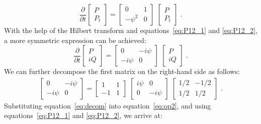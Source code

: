 \begin{equation}
\frac{\partial}{\partial t}\left[ 
\begin{array}{c}
  P \\ 
  P_t \end{array} \right] 
= \left[ 
\begin{array}{cc}
  0 & 1  \\
  -\psi^2 & 0 \end{array} \right] 
\; \left[ 
\begin{array}{c}
  P \\ 
  P_t \end{array} \right] \; .  \label{eqn:op1}
\end{equation}
With the help of the Hilbert transform and equations~\ref{eq:P12_1} and \ref{eq:P12_2}, a more symmetric expression can be achieved:
\begin{equation}
\frac{\partial}{\partial t}\left[ 
\begin{array}{c}
  P \\ 
  iQ \end{array} \right] 
= \left[ 
\begin{array}{cc}
  0      & -i\psi  \\
  -i\psi  & 0 \end{array} \right] 
\; \left[ 
\begin{array}{c}
  P \\ 
  iQ \end{array} \right] \; .  \label{eq:op2}
\end{equation}
We can further decompose the first matrix on the right-hand side as follows:
\begin{eqnarray}
 \label{eq:decom}
\left[ 
\begin{array}{cc}
  0      & -i\psi  \\
  -i\psi  & 0 \end{array} \right] = 
\left[ 
\begin{array}{cc}
  1  & 1 \\ 
  -1 & 1 \end{array} \right]
\; \left[ 
\begin{array}{cc}
  i\psi & 0 \\ 
  0     & -i\psi \end{array} \right]
\; \left[
\begin{array}{cc}
 1/2 & -1/2 \\ 
 1/2 &  1/2 \end{array} \right] \; . 
\end{eqnarray}
Substituting equation~\ref{eq:decom} into equation~\ref{eq:op2}, and using equations~\ref{eq:P12_1} and \ref{eq:P12_2}, we arrive at:

